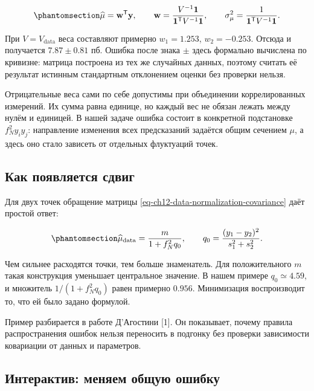 \documentclass[
  russian,
  11pt,
  a4paper,
  open=any]{scrbook}
\begin{document}
\begin{equation}\protect\phantomsection\label{eq-ch12-correlated-mean-weights}{
\widehat\mu=\mathbf w^{\mathsf T}\mathbf y,
\qquad
\mathbf w=\frac{V^{-1}\mathbf1}{\mathbf1^{\mathsf T}V^{-1}\mathbf1},
\qquad
\sigma_\mu^2=\frac1{\mathbf1^{\mathsf T}V^{-1}\mathbf1}.
}\end{equation}

При \(V=V_{\mathrm{data}}\) веса составляют примерно \(w_1=1.253\),
\(w_2=-0.253\). Отсюда и получается \(7.87\pm0.81\) пб. Ошибка после
знака \(\pm\) здесь формально вычислена по кривизне: матрица построена
из тех же случайных данных, поэтому считать её результат истинным
стандартным отклонением оценки без проверки нельзя.

Отрицательные веса сами по себе допустимы при объединении
коррелированных измерений. Их сумма равна единице, но каждый вес не
обязан лежать между нулём и единицей. В нашей задаче ошибка состоит в
конкретной подстановке \(f_N^2y_i y_j\): направление изменения всех
предсказаний задаётся общим сечением \(\mu\), а здесь оно стало зависеть
от отдельных флуктуаций точек.

\subsection{Как появляется
сдвиг}\label{ux43aux430ux43a-ux43fux43eux44fux432ux43bux44fux435ux442ux441ux44f-ux441ux434ux432ux438ux433}

Для двух точек обращение матрицы
\ref{eq-ch12-data-normalization-covariance} даёт простой ответ:

\begin{equation}\protect\phantomsection\label{eq-ch12-dagostini-shift}{
\widehat\mu_{\mathrm{data}}
=\frac{m}{1+f_N^2q_0},
\qquad
q_0=\frac{(y_1-y_2)^2}{s_1^2+s_2^2}.
}\end{equation}

Чем сильнее расходятся точки, тем больше знаменатель. Для положительного
\(m\) такая конструкция уменьшает центральное значение. В нашем примере
\(q_0\simeq4.59\), и множитель \(1/(1+f_N^2q_0)\) равен примерно
\(0.956\). Минимизация воспроизводит то, что ей было задано формулой.

Пример разбирается в работе Д'Агостини {[}1{]}. Он показывает, почему
правила распространения ошибок нельзя переносить в подгонку без проверки
зависимости ковариации от данных и параметров.

\subsection{Интерактив: меняем общую
ошибку}\label{interactive-least-squares-normalization}
\end{document}
